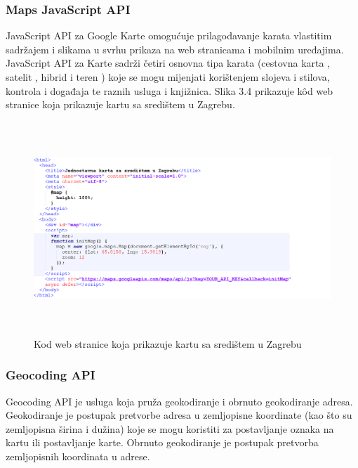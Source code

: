 \documentclass[times, utf8, zavrsni, numeric]{fer}
\begin{document}
\subsubsection{Maps JavaScript API}
JavaScript API  za Google Karte  omogućuje prilagođavanje karata vlastitim sadržajem i slikama u svrhu prikaza na web stranicama i mobilnim uređajima. JavaScript API za Karte sadrži četiri osnovna tipa karata (cestovna karta , satelit , hibrid  i teren ) koje se mogu mijenjati korištenjem slojeva i stilova, kontrola i događaja te raznih usluga i knjižnica\cite{Overview86:online}. Slika 3.4 prikazuje kôd web stranice koja prikazuje kartu sa središtem u Zagrebu.
\begin{figure}[htb]
\centering
\includegraphics[height=8cm]{maps-js-api.png}
\caption{Kod web stranice koja prikazuje kartu sa središtem u Zagrebu}
\label{fig:mapsJs}
\end{figure}
\subsubsection{Geocoding API}
Geocoding API je usluga koja pruža geokodiranje i obrnuto geokodiranje adresa. Geokodiranje je postupak pretvorbe adresa u zemljopisne koordinate (kao što su zemljopisna širina i dužina) koje se mogu koristiti za postavljanje oznaka na kartu ili postavljanje karte\cite{GetStart0:online}. Obrnuto geokodiranje je postupak pretvorba zemljopisnih koordinata u adrese.
\end{document}
